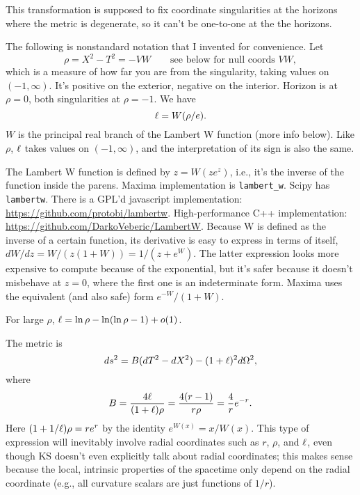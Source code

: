 \documentclass{article}
\begin{document}
This transformation is supposed to fix coordinate singularities at the horizons where the
metric is degenerate, so it can't be one-to-one at the the horizons.

The following is nonstandard notation that I invented for convenience.
Let
\begin{equation}
  \rho = X^2-T^2 = -VW \qquad \text{see below for null coords $VW$},
\end{equation}
which is a measure of how far you are from the singularity, taking values on $(-1,\infty)$.
It's positive on the exterior, negative on the interior. Horizon is at
$\rho=0$, both singularities at $\rho=-1$. We have
\begin{equation}
  \ell  = W(\rho/e).
\end{equation}
$W$ is the principal real branch of the Lambert W function (more info below).
Like $\rho$, $\ell $ takes values on $(-1,\infty)$, and
the interpretation of its sign is also the same. 

The Lambert 
W function is defined
by $z=W(ze^z)$, i.e., it's the inverse of the function inside the parens. 
Maxima implementation is \texttt{lambert\_w}. Scipy has \texttt{lambertw}.
There is a GPL'd javascript implementation: \url{https://github.com/protobi/lambertw}.
High-performance C++ implementation: \url{https://github.com/DarkoVeberic/LambertW}.
Because W is defined as the inverse of a certain function, its derivative is easy
to express in terms of itself, $dW/dz=W/(z(1+W))=1/(z+e^W)$. The latter expression
looks more expensive to compute because of the exponential, but it's safer because
it doesn't misbehave at $z=0$, where the first one is an indeterminate form.
Maxima uses the equivalent (and also safe) form $e^{-W}/(1+W)$.

For large $\rho$,
$\ell =\ln\rho-\ln(\ln\rho-1)+o(1)$.

The metric is
\begin{equation}
  ds^2 = B(dT^2-dX^2)-(1+\ell )^2d\Omega^2,
\end{equation}
where
\begin{equation}
  B = \frac{4\ell }{(1+\ell )\rho} = \frac{4(r-1)}{r\rho}  = \frac{4}{r}e^{-r}.
\end{equation}
Here $(1+1/\ell )\rho=re^r$ by the identity $e^{W(x)}=x/W(x)$. 
This type of expression will inevitably involve radial coordinates such as $r$, $\rho$, and
$\ell $, even though KS doesn't even explicitly talk about radial coordinates; this makes
sense because the local, intrinsic properties of the spacetime only depend on the radial
coordinate (e.g., all curvature scalars are just functions of $1/r$).
\end{document}
